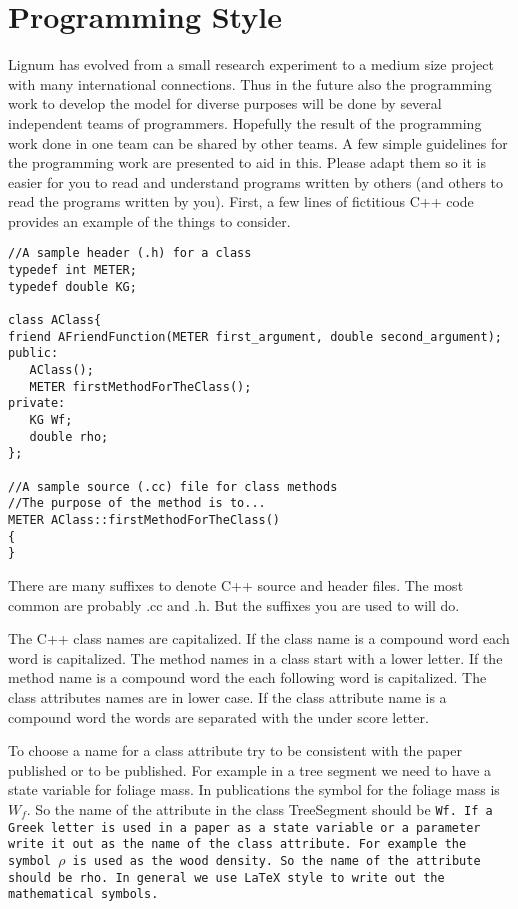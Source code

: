 \section{Programming Style}

Lignum has evolved from  a small research experiment  to a medium size
project with many international connections.   Thus in the future also
the programming work to develop the model for diverse purposes will be
done by several  independent teams of programmers.
Hopefully the result of  the programming work done  in one team can be
shared by  other teams.  A  few simple  guidelines for the programming
work are presented to aid in this.  Please adapt  them so it is easier
for you to read and understand programs  written by others (and others
to  read the  programs  written  by  you).  First,   a   few lines  of
fictitious C++ code provides an example of the things to consider.

\begin{verbatim}
//A sample header (.h) for a class
typedef int METER;
typedef double KG;

class AClass{
friend AFriendFunction(METER first_argument, double second_argument);
public:
   AClass();
   METER firstMethodForTheClass();
private:
   KG Wf;
   double rho;
};

//A sample source (.cc) file for class methods
//The purpose of the method is to...
METER AClass::firstMethodForTheClass()
{
}
\end{verbatim}

There are many  suffixes to  denote C++  source and  header files. The
most common are probably .cc and .h. But the suffixes  you are used to
will do.

The C++ class names are capitalized.  If  the class name is a compound
word each word is capitalized. The method names  in a class start with
a  lower letter.  If the method   name is a    compound word the  each
following word is capitalized. The class attributes names are in lower
case. If the class  attribute name is a  compound  word the words  are
separated with the under score letter.

To choose a name for  a class attribute try  to be consistent with the
paper published or to be published.  For example  in a tree segment we
need to  have a state variable  for foliage mass.  In publications the
symbol for the foliage mass is $W_f$.  So the name of the attribute in
the class TreeSegment should be \tt Wf\rm.  If a  Greek letter is used
in a paper as a state variable or a parameter write it out as the name
of the class attribute.  For example the symbol  $\rho$ is used as the
wood density.  So the name of the attribute  should be \tt rho\rm.  In
general we use \LaTeX \ style to write out the mathematical symbols.

